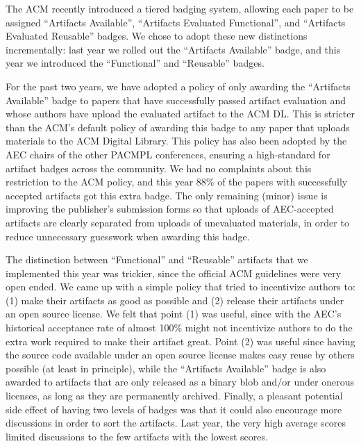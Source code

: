 The ACM recently introduced a tiered badging system, allowing each
paper to be assigned “Artifacts Available”, “Artifacts Evaluated
Functional”, and “Artifacts Evaluated Reusable” badges. We chose to
adopt these new distinctions incrementally: last year we rolled out
the “Artifacts Available” badge, and this year we introduced the
“Functional” and “Reusable” badges.

For the past two years, we have adopted a policy of only awarding the
“Artifacts Available” badge to papers that have successfully passed
artifact evaluation and whose authors have upload the evaluated
artifact to the ACM DL. This is stricter than the ACM's default policy
of awarding this badge to any paper that uploads materials to the ACM
Digital Library. This policy has also been adopted by the AEC chairs
of the other PACMPL conferences, ensuring a high-standard for artifact
badges across the community. We had no complaints about this
restriction to the ACM policy, and this year 88\% of the papers with
successfully accepted artifacts got this extra badge. The only
remaining (minor) issue is improving the publisher's submission forms
so that uploads of AEC-accepted artifacts are clearly separated from
uploads of unevaluated materials, in order to reduce unnecessary
guesswork when awarding this badge.

The distinction between “Functional” and “Reusable” artifacts that we
implemented this year was trickier, since the official ACM guidelines
were very open ended. We came up with a simple policy that tried to
incentivize authors to: (1) make their artifacts as good as possible
and (2) release their artifacts under an open source license. We felt
that point (1) was useful, since with the AEC's historical acceptance
rate of almost 100\% might not incentivize authors to do the extra
work required to make their artifact great. Point (2) was useful since
having the source code available under an open source license makes
easy reuse by others possible (at least in principle), while the
“Artifacts Available” badge is also awarded to artifacts that are only
released as a binary blob and/or under onerous licenses, as long as
they are permanently archived. Finally, a pleasant potential side
effect of having two levels of badges was that it could also encourage
more discussions in order to sort the artifacts. Last year, the very
high average scores limited discussions to the few artifacts with the
lowest scores.

